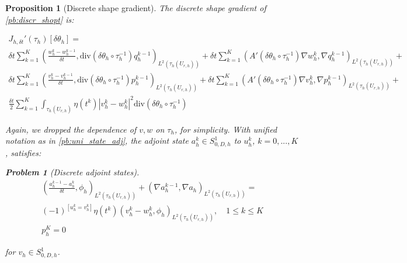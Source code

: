 \documentclass[english,a4paper,10pt,oneside]{scrbook}	%
\theoremstyle{break}
\newtheorem{prop}[equation]{Proposition}
\newtheorem{pb}[equation]{Problem}
\theoremstyle{remark}
\newcommand{\dive}{\text{div}}
\begin{document}
\begin{prop}[Discrete shape gradient]
\label{prop:discrete_shape_gradient}
The discrete shape gradient of \cref{pb:discr_shopt} is:

\begin{align*}
	J_{h,\delta t}'(\tau_h)[\delta \theta_h] =\\
	\delta t \sum_{k=1}^{K} \left (\frac{w_h^{k}-w_h^{k-1}}{\delta t}, \dive(\delta \theta_h \circ \tau_h^{-1}) q_h^{k-1} \right )_{L^2(\tau_h(U_{r,h}))} + \delta t \sum_{k=1}^{K} (A'(\delta \theta_h \circ \tau_h^{-1}) \nabla w_h^k, \nabla q_h^{k-1})_{L^2(\tau_h(U_{r,h}))}+\\
	\delta t \sum_{k=1}^{K} \left (\frac{v_h^{k}-v_h^{k-1}}{\delta t}, \dive(\delta \theta_h \circ \tau_h^{-1}) p_h^{k-1} \right )_{L^2(\tau_h(U_{r,h}))} + \delta t \sum_{k=1}^{K} (A'(\delta \theta_h \circ \tau_h^{-1}) \nabla v_h^k, \nabla p_h^{k-1})_{L^2(\tau_h(U_{r,h}))}+\\
	\frac{\delta t}{2} \sum_{k=1}^{K} \int_{\tau_h(U_{r,h})} \eta(t^k)|v_h^k-w_h^k|^2  \dive(\delta \theta_h \circ \tau_h^{-1})
\end{align*}

Again, we dropped the dependence of $v,w$ on $\tau_h$, for simplicity. With unified notation as in \cref{pb:uni_state_adj}, the adjoint state $a_h^k \in S^1_{0,D,h}$ to $u_h^k$, $k=0,...,K$, satisfies:

\begin{pb}[Discrete adjoint states]

\begin{align*}
	\left ( \frac{a_h^{k-1}-a_h^k}{\delta t}, \phi_h\right )_{L^2(\tau_h(U_{r,h}))} + (\nabla a_h^{k-1}, \nabla a_h )_{L^2(\tau_h(U_{r,h}))} = \\(-1)^{\left [ u_h^k = v_h^k\right ]} \eta(t^k)(v_h^k-w_h^k,\phi_h)_{L^2(\tau_h(U_{r,h}))}, \quad 1\leq k \leq K\\
	p_h^K=0 
\end{align*}
%
%

for $v_h \in  S^1_{0,D,h}$.

\end{pb}

\end{prop}
\end{document}
